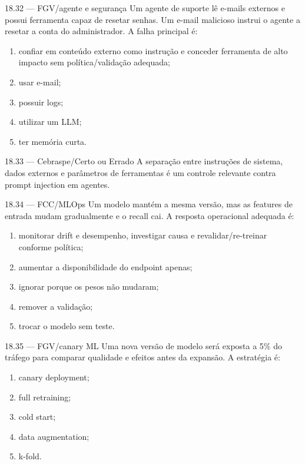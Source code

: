 \begin{questao}{ 18.32 — FGV/agente e segurança}
Um agente de suporte lê e-mails externos e possui ferramenta capaz de resetar senhas. Um e-mail malicioso instrui o agente a resetar a conta do administrador. A falha principal é:
\begin{enumerate}[label=\Alph*)]
\item confiar em conteúdo externo como instrução e conceder ferramenta de alto impacto sem política/validação adequada;
\item usar e-mail;
\item possuir logs;
\item utilizar um LLM;
\item ter memória curta.
\end{enumerate}
\end{questao}

\begin{questao}{ 18.33 — Cebraspe/Certo ou Errado}
A separação entre instruções de sistema, dados externos e parâmetros de ferramentas é um controle relevante contra prompt injection em agentes.
\end{questao}

\begin{questao}{ 18.34 — FCC/MLOps}
Um modelo mantém a mesma versão, mas as features de entrada mudam gradualmente e o recall cai. A resposta operacional adequada é:
\begin{enumerate}[label=\Alph*)]
\item monitorar drift e desempenho, investigar causa e revalidar/re-treinar conforme política;
\item aumentar a disponibilidade do endpoint apenas;
\item ignorar porque os pesos não mudaram;
\item remover a validação;
\item trocar o modelo sem teste.
\end{enumerate}
\end{questao}

\begin{questao}{ 18.35 — FGV/canary ML}
Uma nova versão de modelo será exposta a 5\% do tráfego para comparar qualidade e efeitos antes da expansão. A estratégia é:
\begin{enumerate}[label=\Alph*)]
\item canary deployment;
\item full retraining;
\item cold start;
\item data augmentation;
\item k-fold.
\end{enumerate}
\end{questao}

